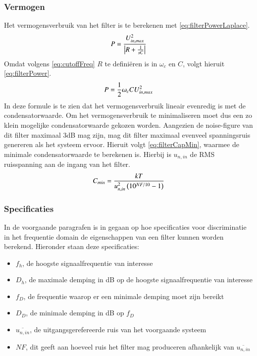 \subsubsection{Vermogen}
Het vermogensverbruik van het filter is te berekenen met \cref{eq:filterPowerLaplace}.
\begin{equation} \label{eq:filterPowerLaplace}
    P = \frac{U_{in,max}^2}{\left|R + \frac{1}{sC}\right|}
    \tagaddtext{[\si{\watt}]}
\end{equation}
Omdat volgens \cref{eq:cutoffFreq} $R$ te definiëren is in $\omega_c$ en $C$, volgt hieruit \cref{eq:filterPower}.
\begin{equation} \label{eq:filterPower}
    P = \frac{1}{2}\omega_cCU_{in,max}^2
    \tagaddtext{[\si{\watt}]}
\end{equation}
In deze formule is te zien dat het vermogensverbruik lineair evenredig is met de condensatorwaarde. Om het vermogensverbruik te minimaliseren moet dus een zo klein mogelijke condensatorwaarde gekozen worden. Aangezien de noise-figure van dit filter maximaal 3dB mag zijn, mag dit filter maximaal evenveel spanningsruis genereren als het systeem ervoor. Hieruit volgt \cref{eq:filterCapMin}, waarmee de minimale condensatorwaarde te berekenen is. Hierbij is $u_{n,in}$ de RMS ruisspanning aan de ingang van het filter.
\begin{equation} \label{eq:filterCapMin}
    C_{min} = \frac{kT}{u_{n,in}^2\left(10^{NF/10}-1\right)}
    \tagaddtext{[\si{\farad}]}
\end{equation}

\subsubsection{Specificaties}
In de voorgaande paragrafen is in gegaan op hoe specificaties voor discriminatie in het frequentie domain de eigenschappen van een filter kunnen worden berekend. Hieronder staan deze specificaties:
\begin{itemize}
    \item $f_h$, de hoogste signaalfrequentie van interesse
    \item $D_h$, de maximale demping in dB op de hoogste signaalfrequentie van interesse
    \item $f_D$, de frequentie waarop er een minimale demping moet zijn bereikt
    \item $D_D$, de minimale demping in dB op $f_D$
    \item $\overline{u_{n,in}}$, de uitgangsgerefereerde ruis van het voorgaande systeem
    \item $NF$, dit geeft aan hoeveel ruis het filter mag produceren afhankelijk van $\overline{u_{n,in}}$
\end{itemize}

